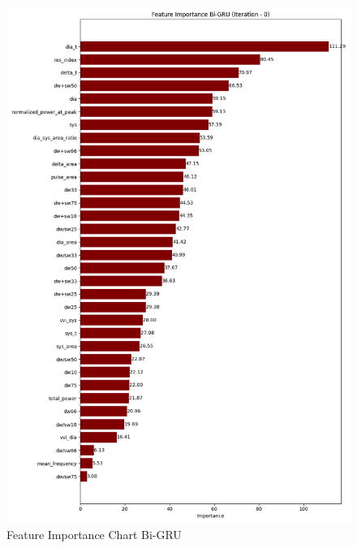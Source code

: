 \begin{figure}[h]
    \centering
    \vspace{-1cm}
    \hspace{-2cm}
    \includegraphics[width=\textwidth]{images/results/feature_importance/feature_importance_plot_Bi-GRU_0}
    \caption{Feature Importance Chart Bi-GRU}
    \label{fig:fi_bi_gru}
\end{figure}